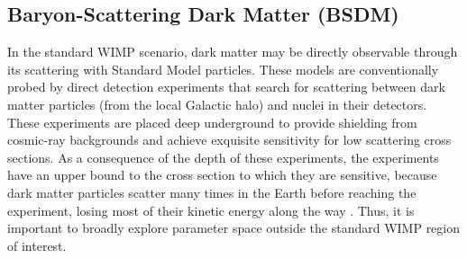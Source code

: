 
     
\subsection{Baryon-Scattering Dark Matter (BSDM) }
\label{sec:bsdm}

In the standard WIMP scenario, dark matter may be directly observable through its scattering with Standard Model particles.
These models are conventionally probed by direct detection experiments that search for scattering between dark matter particles (from the local Galactic halo) and nuclei in their detectors.
These experiments are placed deep underground to provide shielding from cosmic-ray backgrounds and achieve exquisite sensitivity for low scattering cross sections. As a consequence of the depth of these experiments, the experiments have an upper bound to the cross section to which they are sensitive, because dark matter particles scatter many times in the Earth before reaching the experiment, losing most of their kinetic energy along the way \citep{Zaharijas:2004jv}.
Thus, it is important to broadly explore parameter space outside the standard WIMP region of interest.

